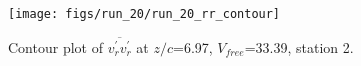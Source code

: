 \begin{figure}[H]
\centering
\texttt{[image: figs/run\_20/run\_20\_rr\_contour]}
\caption{Contour plot of $\overline{v_{r}^{\prime} v_{r}^{\prime}}$ at $z/c$=6.97, $V_{free}$=33.39, station 2.}
\label{fig:run_20_rr_contour}
\end{figure}


